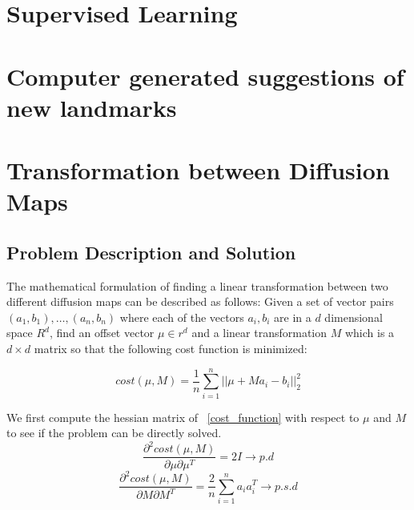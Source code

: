 \documentclass[runningheads]{llncs}
\begin{document}
\section{Supervised Learning}

\section{Computer generated suggestions of new landmarks}

 
 

\appendix


\section{Transformation between Diffusion Maps}
\subsection{Problem Description and Solution}
The mathematical formulation of finding a linear transformation between two different diffusion maps can be described as follows: Given a set of vector pairs $(a_1,b_1),\ldots,(a_n,b_n)$ where each of the vectors $a_i,b_i$ are in a $d$ dimensional space $R^d$,  find an offset vector $\mu \in r^d$ and a linear transformation $M$ which is a $d \times d$ matrix so that the following cost function is minimized:

\begin{equation}
\label{cost_function}
    cost(\mu, M) = \frac{1}{n}\sum_{i=1}^n||\mu + Ma_i - b_i||_2^2
\end{equation}

We first compute the hessian matrix of ~\ref{cost_function} with respect to $\mu$ and $M$ to see if the problem can be directly solved.
\begin{equation}
\label{hessian_1}
    \frac{\partial^2 cost(\mu, M)}{\partial \mu \partial \mu^T} = 2I \rightarrow p.d
\end{equation}
\begin{equation}
\label{hessian_2}
    \frac{\partial^2 cost(\mu, M)}{\partial M \partial M^T} = \frac{2}{n}\sum_{i=1}^na_ia_i^T \rightarrow p.s.d
\end{equation}
\end{document}

